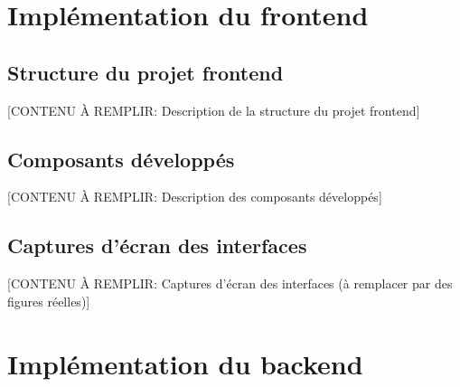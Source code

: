 \section{Implémentation du frontend}


\subsection{Structure du projet frontend}

[CONTENU À REMPLIR: Description de la structure du projet frontend]


\subsection{Composants développés}


[CONTENU À REMPLIR: Description des composants développés]

\subsection{Captures d'écran des interfaces}


[CONTENU À REMPLIR: Captures d'écran des interfaces (à remplacer par des figures réelles)]


\section{Implémentation du backend}

